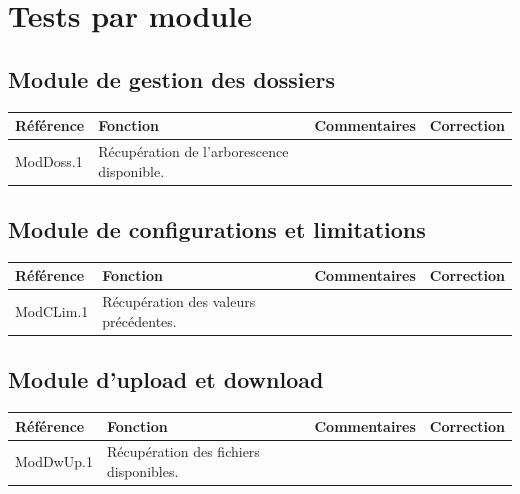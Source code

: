 \documentclass[10pt,a4paper,landscape]{report}
\begin{document}

\section{Tests par module}

\subsection{Module de gestion des dossiers}

\begin{center}
	\bgroup
	\def\arraystretch{1.5}
	\begin{tabular}{|p{2.5cm}|p{8cm}|p{8cm}|p{8cm}|}
		\hline
		\rowcolor{gris}Référence & Fonction & Commentaires & Correction\\
		\hline
		ModDoss.1 & Récupération de l'arborescence disponible. & & \\
		\hline
	\end{tabular}
	\egroup
\end{center}


\subsection{Module de configurations et limitations}

\begin{center}
	\bgroup
	\def\arraystretch{1.5}
	\begin{tabular}{|p{2.5cm}|p{8cm}|p{8cm}|p{8cm}|}
		\hline
		\rowcolor{gris}Référence & Fonction & Commentaires & Correction\\
		\hline
		ModCLim.1 & Récupération des valeurs précédentes. & & \\
		\hline
	\end{tabular}
	\egroup
\end{center}


\subsection{Module d'upload et download}

\begin{center}
	\bgroup
	\def\arraystretch{1.5}
	\begin{tabular}{|p{2.5cm}|p{8cm}|p{8cm}|p{8cm}|}
		\hline
		\rowcolor{gris}Référence & Fonction & Commentaires & Correction\\
		\hline
		ModDwUp.1 & Récupération des fichiers disponibles. & & \\
		\hline
	\end{tabular}
	\egroup
\end{center}
\end{document}
